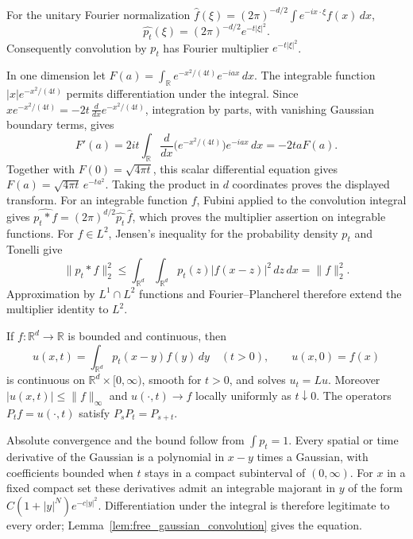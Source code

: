 \begin{lemma}
\label{lem:gaussian_fourier_multiplier}
For the unitary Fourier normalization
$\widehat f(\xi)=(2\pi)^{-d/2}\int e^{-ix\cdot\xi}f(x)\,dx$,
\[
\widehat{p_t}(\xi)=(2\pi)^{-d/2}e^{-t|\xi|^2}.
\]
Consequently convolution by $p_t$ has Fourier multiplier
$e^{-t|\xi|^2}$.
\end{lemma}
\Proof
In one dimension let
$F(a)=\int_{\mathbb R}e^{-x^2/(4t)}e^{-iax}\,dx$.
The integrable function $|x|e^{-x^2/(4t)}$ permits differentiation
under the integral. Since
$x e^{-x^2/(4t)}=-2t\,\frac{d}{dx}e^{-x^2/(4t)}$,
integration by parts, with vanishing Gaussian boundary terms, gives
\[
F'(a)=2it\int_{\mathbb R}
 \frac{d}{dx}\bigl(e^{-x^2/(4t)}\bigr)e^{-iax}\,dx
 =-2taF(a).
\]
Together with $F(0)=\sqrt{4\pi t}$, this scalar differential
equation gives $F(a)=\sqrt{4\pi t}\,e^{-ta^2}$.
Taking the product in $d$ coordinates proves the displayed transform.
For an integrable function $f$, Fubini applied to the convolution
integral gives
$\widehat{p_t*f}=(2\pi)^{d/2}\widehat{p_t}\,\widehat f$,
which proves the multiplier assertion on integrable functions.
For $f\in L^2$, Jensen's inequality for the probability density
$p_t$ and Tonelli give
\[
\|p_t*f\|_2^2
\leq\int_{\mathbb R^d}\int_{\mathbb R^d}
          p_t(z)|f(x-z)|^2\,dz\,dx=\|f\|_2^2.
\]
Approximation by $L^1\cap L^2$ functions and Fourier--Plancherel
therefore extend the multiplier identity to $L^2$.
\Done

\begin{theorem}
\label{thm:free_heat_bounded_data}
If $f:\mathbb R^d\to\mathbb R$ is bounded and continuous, then
\[
u(x,t)=\int_{\mathbb R^d}p_t(x-y)f(y)\,dy\quad(t>0),
\qquad u(x,0)=f(x)
\]
is continuous on $\mathbb R^d\times[0,\infty)$, smooth for $t>0$,
and solves $u_t=Lu$. Moreover
$|u(x,t)|\leq\|f\|_\infty$ and $u(\cdot,t)\to f$ locally
uniformly as $t\downarrow0$. The operators $P_tf=u(\cdot,t)$ satisfy
$P_sP_t=P_{s+t}$.
\end{theorem}
\Proof
Absolute convergence and the bound follow from $\int p_t=1$.
Every spatial or time derivative of the Gaussian is a polynomial
in $x-y$ times a Gaussian, with coefficients bounded when $t$ stays
in a compact subinterval of $(0,\infty)$. For $x$ in a fixed compact
set these derivatives admit an integrable majorant in $y$ of the form
$C(1+|y|^N)e^{-c|y|^2}$. Differentiation under the integral is therefore
legitimate to every order;
Lemma~\ref{lem:free_gaussian_convolution} gives the equation.

